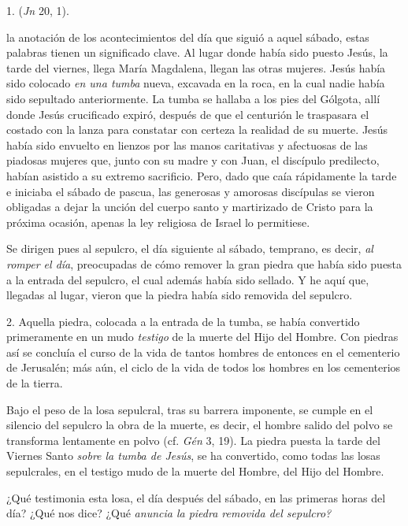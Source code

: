 \begin{body}
1.  (\textit{Jn} 20, 1).

 la anotación de los acontecimientos del día que siguió a aquel sábado, estas palabras tienen un significado clave. Al lugar donde había sido puesto Jesús, la tarde del viernes, llega María Magdalena, llegan las otras mujeres. Jesús había sido colocado \textit{en una tumba} nueva, excavada en la roca, en la cual nadie había sido sepultado anteriormente. La tumba se hallaba a los pies del Gólgota, allí donde Jesús crucificado expiró, después de que el centurión le traspasara el costado con la lanza para constatar con certeza la realidad de su muerte. Jesús había sido envuelto en lienzos por las manos caritativas y afectuosas de las piadosas mujeres que, junto con su madre y con Juan, el discípulo predilecto, habían asistido a su extremo sacrificio. Pero, dado que caía rápidamente la tarde e iniciaba el sábado de pascua, las generosas y amorosas discípulas se vieron obligadas a dejar la unción del cuerpo santo y martirizado de Cristo para la próxima ocasión, apenas la ley religiosa de Israel lo permitiese.

Se dirigen pues al sepulcro, el día siguiente al sábado, temprano, es decir, \textit{al romper el día}, preocupadas de cómo remover la gran piedra que había sido puesta a la entrada del sepulcro, el cual además había sido sellado. Y he aquí que, llegadas al lugar, vieron que la piedra había sido removida del sepulcro.

2. Aquella piedra, colocada a la entrada de la tumba, se había convertido primeramente en un mudo \textit{testigo} de la muerte del Hijo del Hombre. Con piedras así se concluía el curso de la vida de tantos hombres de entonces en el cementerio de Jerusalén; más aún, el ciclo de la vida de todos los hombres en los cementerios de la tierra.

Bajo el peso de la losa sepulcral, tras su barrera imponente, se cumple en el silencio del sepulcro la obra de la muerte, es decir, el hombre salido del polvo se transforma lentamente en polvo (cf. \textit{Gén} 3, 19). La piedra puesta la tarde del Viernes Santo \textit{sobre la tumba de Jesús}, se ha convertido, como todas las losas sepulcrales, en el testigo mudo de la muerte del Hombre, del Hijo del Hombre.

¿Qué testimonia esta losa, el día después del sábado, en las primeras horas del día? ¿Qué nos dice? ¿Qué \textit{anuncia la piedra removida del sepulcro?}


\end{body}
